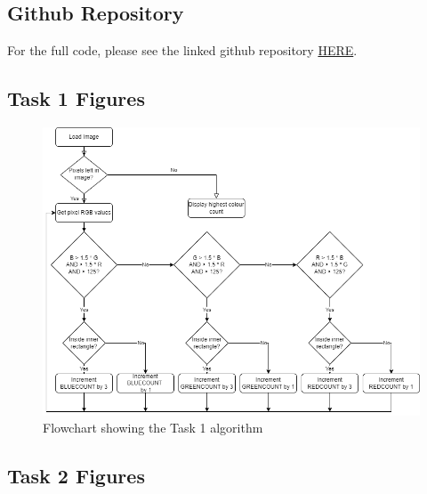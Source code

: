 \documentclass[conference]{IEEEtran}
\begin{document}
\printbibliography


\onecolumn
\subsection{Github Repository}

For the full code, please see the linked github repository \href{https://github.com/jjpendlebury/AINT308-Coursework}{HERE}.
\subsection{Task 1 Figures}\label{app:T1}

\begin{figure}[H]
\centering
\includegraphics[width=5in]{Task1_flowchart}
\caption{Flowchart showing the Task 1 algorithm}
\label{fig:task2_flowchart}
\end{figure}

\subsection{Task 2 Figures}\label{app:T2}
\end{document}
